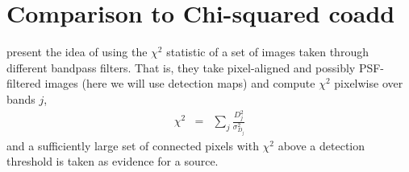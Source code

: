 \documentclass[11pt,letterpaper,linenumbers]{aastex63}
\begin{document}
\section{Comparison to Chi-squared coadd}

\cite{szalay1999} present the idea of using the $\chi^2$
statistic of a set of images taken through different bandpass filters.
That is, they take pixel-aligned and possibly PSF-filtered images
(here we will use detection maps) and compute $\chi^2$ pixelwise
over bands $j$,
\begin{eqnarray}
  \chi^2 &=& \sum_j \frac{D_j^2}{\sigma_{D_j}^2}
\end{eqnarray}
and a sufficiently large set of connected pixels with $\chi^2$ above a
detection threshold is taken as evidence for a source.


\end{document}
